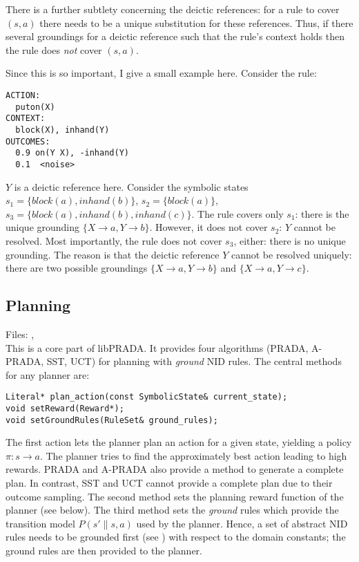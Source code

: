 \documentclass[10pt,twoside,twocolumn,fleqn]{article}
\begin{document}
There is a further subtlety concerning the deictic references: for a rule
to cover $(s,a)$ there needs to be a unique substitution for these
references. Thus, if there several groundings for a deictic reference such
that the rule's context holds then the rule does \emph{not} cover $(s,a)$.

Since this is so important, I give a small example here. Consider the
rule:
\begin{lstlisting}
ACTION:
  puton(X)
CONTEXT:
  block(X), inhand(Y)
OUTCOMES:
  0.9 on(Y X), -inhand(Y)
  0.1  <noise>
\end{lstlisting}
$Y$ is a deictic reference here. Consider the symbolic states $s_1 =
\{block(a), inhand(b)\}$, $s_2 = \{block(a)\}$, $s_3 = \{block(a),
inhand(b), inhand(c)\}$. The rule covers only $s_1$: there is the unique
grounding $\{X \to a, Y \to b\}$. However, it does not cover $s_2$: $Y$
cannot be resolved. Most importantly, the rule does not cover $s_3$,
either: there is no unique grounding. The reason is that the deictic
reference $Y$ cannot be resolved uniquely: there are two possible
groundings $\{X \to a, Y \to b\}$ and $\{X \to a, Y \to c\}$.



\subsection{Planning}

Files: , \\

This is a core part of libPRADA. It provides four algorithms (PRADA,
A-PRADA, SST, UCT) for planning with \emph{ground} NID rules. The central
methods for any planner are:
\begin{lstlisting}
Literal* plan_action(const SymbolicState& current_state);
void setReward(Reward*);
void setGroundRules(RuleSet& ground_rules);
\end{lstlisting}
The first action lets the planner plan an action for a given state,
yielding a policy $\pi: s \to a$. The planner tries to find the
approximately best action leading to high rewards. PRADA and A-PRADA also
provide a method to generate a complete plan. In contrast, SST and UCT
cannot provide a complete plan due to their outcome sampling. The second
method sets the planning reward function of the planner (see below). The
third method sets the \emph{ground} rules which provide the transition
model $P(s'\|s,a)$ used by the planner. Hence, a set of abstract NID rules
needs to be grounded first (see ) with respect to
the domain constants; the ground rules are then provided to the planner.
\end{document}
